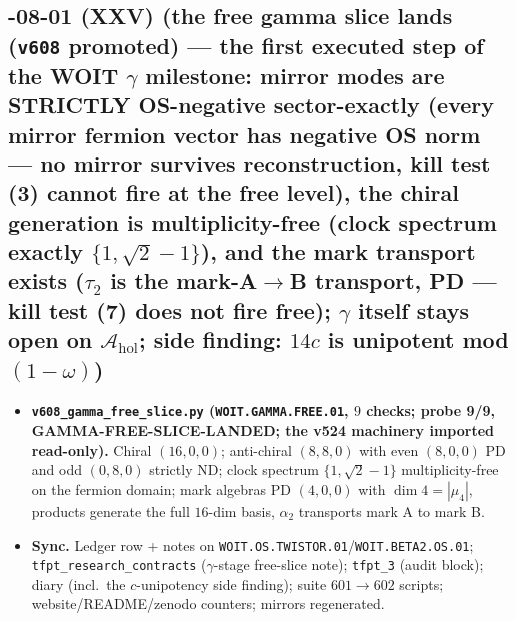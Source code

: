 \subsection*{-08-01 (XXV) (the free gamma slice lands (\texttt{v608} promoted) --- the first executed step of the WOIT $\gamma$ milestone: mirror modes are STRICTLY OS-negative sector-exactly (every mirror fermion vector has negative OS norm --- no mirror survives reconstruction, kill test (3) cannot fire at the free level), the chiral generation is multiplicity-free (clock spectrum exactly $\{1,\sqrt2-1\}$), and the mark transport exists ($\tau_2$ is the mark-A$\to$B transport, PD --- kill test (7) does not fire free); $\gamma$ itself stays open on $\mathcal A_{\mathrm{hol}}$; side finding: $14c$ is unipotent mod $(1-\omega)$)}
\begin{itemize}[leftmargin=1.5em]
\item \textbf{\texttt{v608\_gamma\_free\_slice.py} (\texttt{WOIT.GAMMA.FREE.01}, $9$ checks;
probe 9/9, GAMMA-FREE-SLICE-LANDED; the v524 machinery imported read-only).} Chiral
$(16,0,0)$; anti-chiral $(8,8,0)$ with even $(8,0,0)$ PD and odd $(0,8,0)$ strictly ND;
clock spectrum $\{1,\sqrt2-1\}$ multiplicity-free on the fermion domain; mark algebras PD
$(4,0,0)$ with $\dim 4=|\mu_4|$, products generate the full $16$-dim basis, $\alpha_2$
transports mark A to mark B.
\item \textbf{Sync.} Ledger row + notes on
\texttt{WOIT.OS.TWISTOR.01}/\texttt{WOIT.BETA2.OS.01};
\texttt{tfpt\_research\_contracts} ($\gamma$-stage free-slice note); \texttt{tfpt\_3} (audit
block); diary (incl.\ the $c$-unipotency side finding); suite $601\to602$ scripts;
website/README/zenodo counters; mirrors regenerated.
\end{itemize}

